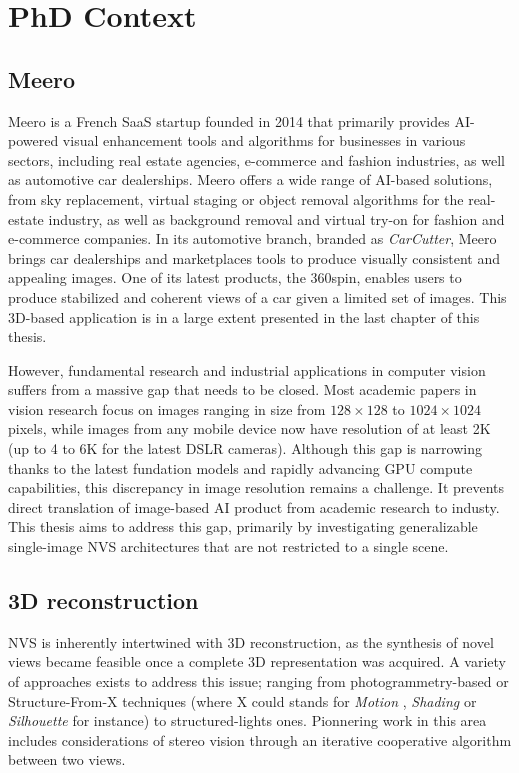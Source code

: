 \section{PhD Context}

\subsection{Meero}
Meero is a French \ac{SaaS} startup founded in 2014 that primarily provides \ac{AI}-powered visual enhancement tools and algorithms for businesses in various sectors, including real estate agencies, e-commerce and fashion industries, as well as automotive car dealerships. Meero offers a wide range of \ac{AI}-based solutions, from sky replacement, virtual staging or object removal algorithms for the real-estate industry, as well as background removal and virtual try-on for fashion and e-commerce companies. In its automotive branch, branded as \textit{CarCutter}, Meero brings car dealerships and marketplaces tools to produce visually consistent and appealing images. One of its latest products, the 360\degree spin, enables users to produce stabilized and coherent views of a car given a limited set of images. This 3D-based application is in a large extent presented in the last chapter of this thesis.

However, fundamental research and industrial applications in computer vision suffers from a massive gap that needs to be closed. Most academic papers in vision research focus on images ranging in size from $128\times128$ to $1024\times1024$ pixels, while images from any mobile device now have resolution of at least 2K (up to 4 to 6K for the latest \ac{DSLR} cameras). Although this gap is narrowing thanks to the latest fundation models and rapidly advancing \ac{GPU} compute capabilities, this discrepancy in image resolution remains a challenge. It prevents direct translation of image-based \ac{AI} product from academic research to industy. This thesis aims to address this gap, primarily by investigating generalizable single-image \ac{NVS} architectures that are not restricted to a single scene. 

\subsection{3D reconstruction}
 \ac{NVS} is inherently intertwined with 3D reconstruction, as the synthesis of novel views became feasible once a complete 3D representation was acquired. A variety of approaches exists to address this issue; ranging from photogrammetry-based or Structure-From-X techniques (where X could stands for \textit{Motion} \citep{longuet1981computer}, \textit{Shading} \citep{horn1989obtaining} or \textit{Silhouette} \citep{baumgart1974geometric} for instance) to structured-lights ones. Pionnering work in this area includes considerations of stereo vision \citep{marr1976cooperative} through an iterative cooperative algorithm between two views. 
 
